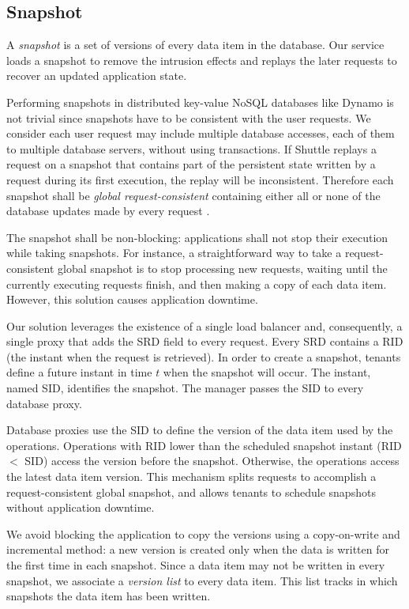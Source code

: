 \subsection{Snapshot}
\label{sec:architecture:snapshot}

A \emph{snapshot} is a set of versions of every data item in the database. Our service loads a snapshot to remove the intrusion effects and replays the later requests to recover an updated application state. 

Performing snapshots in distributed key-value NoSQL databases like Dynamo is not trivial since snapshots have to be consistent with the user requests. We consider each user request may include multiple database accesses, each of them to multiple database servers, without using transactions. 
If Shuttle replays a request on a snapshot that contains part of the persistent state written by a request during its first execution, the replay will be inconsistent. Therefore each snapshot shall be \emph{global request-consistent} containing either all or none of the database updates made by every request \cite{checkpoint-survey}. 

The snapshot shall be non-blocking: applications shall not stop their execution while taking snapshots. For instance, a straightforward way to take a request-consistent global snapshot is to stop processing new requests, waiting until the currently executing requests finish, and then making a copy of each data item. However, this solution causes application downtime.

Our solution leverages the existence of a single load balancer and, consequently, a single proxy that adds the \ac{SRD} field to every request. Every \ac{SRD} contains a \ac{RID} (the instant when the request is retrieved). In order to create a snapshot, tenants define a future instant in time $t$ when the snapshot will occur. The instant, named \acf{SID}, identifies the snapshot. The manager passes the \ac{SID} to every database proxy.

Database proxies use the \ac{SID} to define the version of the data item used by the operations. Operations with \acf{RID} lower than the scheduled snapshot instant (\ac{RID} $<$ \ac{SID}) access the version before the snapshot. Otherwise, the operations access the latest data item version. This mechanism splits requests to accomplish a request-consistent global snapshot, and allows tenants to schedule snapshots without application downtime. 

We avoid blocking the application to copy the versions using a copy-on-write and incremental method: a new version is created only when the data is written for the first time in each snapshot. Since a data item may not be written in every snapshot, we associate a \emph{version list} to every data item. This list tracks in which snapshots the data item has been written.


